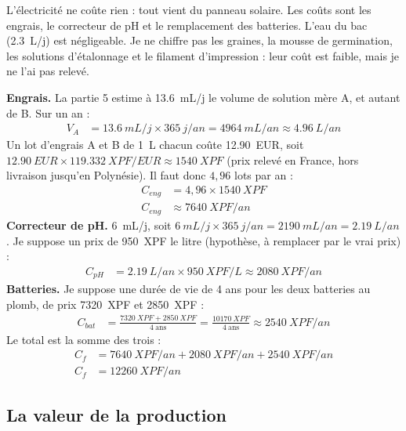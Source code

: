 L'électricité ne coûte rien : tout vient du panneau solaire. Les coûts sont les engrais, le correcteur de pH et le remplacement des batteries. L'eau du bac (\qty{2,3}{L/j}) est négligeable. Je ne chiffre pas les graines, la mousse de germination, les solutions d'étalonnage et le filament d'impression : leur coût est faible, mais je ne l'ai pas relevé.

\begin{demonstration}
\textbf{Engrais.} La partie 5 estime à \qty{13,6}{mL/j} le volume de solution mère A, et autant de B. Sur un an :
\begin{align*}
V_{A} &= \qty{13,6}{mL/j} \times \qty{365}{j/an} = \qty{4964}{mL/an} \approx \qty{4,96}{L/an}
\end{align*}
Un lot d'engrais A et B de \qty{1}{L} chacun coûte \qty{12,90}{EUR}, soit $\qty{12,90}{EUR} \times \qty{119,332}{XPF/EUR} \approx \qty{1540}{XPF}$ (prix relevé en France, hors livraison jusqu'en Polynésie). Il faut donc $4{,}96$ lots par an :
\begin{align*}
C_{eng} &= 4{,}96 \times \qty{1540}{XPF}\\
C_{eng} &\approx \qty{7640}{XPF/an}
\end{align*}
\textbf{Correcteur de pH.} \qty{6}{mL/j}, soit $\qty{6}{mL/j} \times \qty{365}{j/an} = \qty{2190}{mL/an} = \qty{2,19}{L/an}$. Je suppose un prix de \qty{950}{XPF} le litre (hypothèse, à remplacer par le vrai prix) :
\begin{align*}
C_{pH} &= \qty{2,19}{L/an} \times \qty{950}{XPF/L} \approx \qty{2080}{XPF/an}
\end{align*}
\textbf{Batteries.} Je suppose une durée de vie de 4 ans pour les deux batteries au plomb, de prix \qty{7320}{XPF} et \qty{2850}{XPF} :
\begin{align*}
C_{bat} &= \frac{\qty{7320}{XPF} + \qty{2850}{XPF}}{4\ \text{ans}} = \frac{\qty{10170}{XPF}}{4\ \text{ans}} \approx \qty{2540}{XPF/an}
\end{align*}
Le total est la somme des trois :
\begin{align*}
C_f &= \qty{7640}{XPF/an} + \qty{2080}{XPF/an} + \qty{2540}{XPF/an}\\
C_f &= \qty{12260}{XPF/an}
\end{align*}
\end{demonstration}

\subsection{La valeur de la production}

